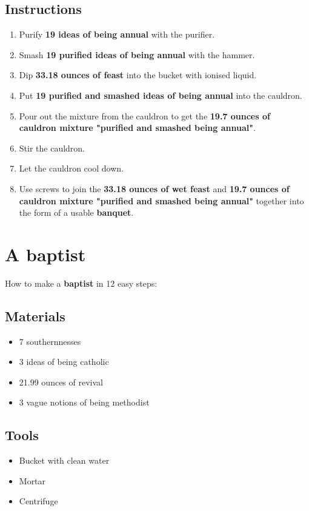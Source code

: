 \documentclass{article}
\begin{document}
\subsection{Instructions}\begin{enumerate}
\item 
Purify \textbf{19 ideas of being annual} with the purifier.
\item 
Smash \textbf{19 purified ideas of being annual} with the hammer.
\item 
Dip \textbf{33.18 ounces of feast} into the bucket with ionised liquid.
\item 
Put \textbf{19 purified and smashed ideas of being annual} into the cauldron.
\item 
Pour out the mixture from the cauldron to get the \textbf{19.7 ounces of cauldron mixture "purified and smashed being annual"}.
\item 
Stir the cauldron.
\item 
Let the cauldron cool down.
\item 
Use screws to join the \textbf{33.18 ounces of wet feast} and \textbf{19.7 ounces of cauldron mixture "purified and smashed being annual"} together into the form of a usable \textbf{banquet}.
\end{enumerate}
\newpage
\section{A baptist}How to make a \textbf{baptist} in 12 easy steps:

\subsection{Materials}\begin{itemize}
\item 
7 southernnesses
\item 
3 ideas of being catholic
\item 
21.99 ounces of revival
\item 
3 vague notions of being methodist
\end{itemize}
\subsection{Tools}\begin{itemize}
\item 
Bucket with clean water
\item 
Mortar
\item 
Centrifuge
\end{itemize}
\end{document}
